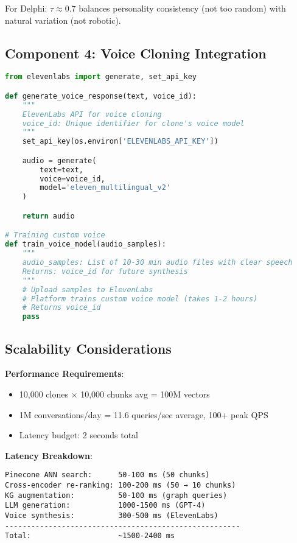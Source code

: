 \documentclass[10pt]{article}
\begin{document}
For Delphi: $\tau \approx 0.7$ balances personality consistency (not too random) with natural variation (not robotic).

\subsection{Component 4: Voice Cloning Integration}

\begin{lstlisting}[language=Python]
from elevenlabs import generate, set_api_key

def generate_voice_response(text, voice_id):
    """
    ElevenLabs API for voice cloning
    voice_id: Unique identifier for clone's voice model
    """
    set_api_key(os.environ['ELEVENLABS_API_KEY'])

    audio = generate(
        text=text,
        voice=voice_id,
        model='eleven_multilingual_v2'
    )

    return audio

# Training custom voice
def train_voice_model(audio_samples):
    """
    audio_samples: List of 10-30 min audio files with clear speech
    Returns: voice_id for future synthesis
    """
    # Upload samples to ElevenLabs
    # Platform trains custom voice model (takes 1-2 hours)
    # Returns voice_id
    pass
\end{lstlisting}

\subsection{Scalability Considerations}

\textbf{Performance Requirements}:
\begin{itemize}[leftmargin=*]
    \item 10,000 clones × 10,000 chunks avg = 100M vectors
    \item 1M conversations/day = 11.6 queries/sec average, 100+ peak QPS
    \item Latency budget: 2 seconds total
\end{itemize}

\textbf{Latency Breakdown}:
\begin{verbatim}
Pinecone ANN search:      50-100 ms (50 chunks)
Cross-encoder re-ranking: 100-200 ms (50 → 10 chunks)
KG augmentation:          50-100 ms (graph queries)
LLM generation:           1000-1500 ms (GPT-4)
Voice synthesis:          300-500 ms (ElevenLabs)
------------------------------------------------------
Total:                    ~1500-2400 ms
\end{verbatim}
\end{document}
